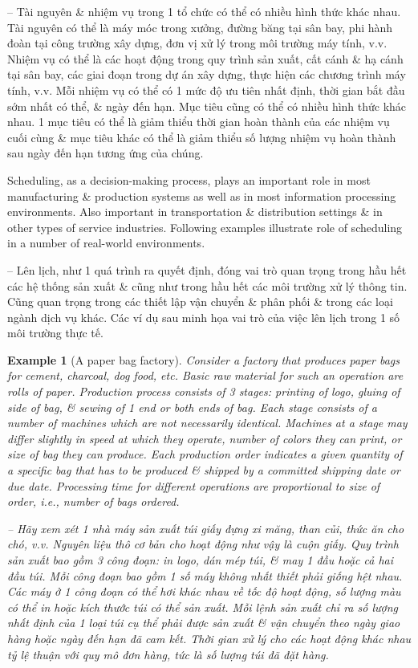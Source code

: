 \documentclass{article}
\newtheorem{example}{Example}
\begin{document}
\begin{itemize}
\begin{itemize}
        -- Tài nguyên \& nhiệm vụ trong 1 tổ chức có thể có nhiều hình thức khác nhau. Tài nguyên có thể là máy móc trong xưởng, đường băng tại sân bay, phi hành đoàn tại công trường xây dựng, đơn vị xử lý trong môi trường máy tính, v.v. Nhiệm vụ có thể là các hoạt động trong quy trình sản xuất, cất cánh \& hạ cánh tại sân bay, các giai đoạn trong dự án xây dựng, thực hiện các chương trình máy tính, v.v. Mỗi nhiệm vụ có thể có 1 mức độ ưu tiên nhất định, thời gian bắt đầu sớm nhất có thể, \& ngày đến hạn. Mục tiêu cũng có thể có nhiều hình thức khác nhau. 1 mục tiêu có thể là giảm thiểu thời gian hoàn thành của các nhiệm vụ cuối cùng \& mục tiêu khác có thể là giảm thiểu số lượng nhiệm vụ hoàn thành sau ngày đến hạn tương ứng của chúng.
        
        Scheduling, as a decision-making process, plays an important role in most manufacturing \& production systems as well as in most information processing environments. Also important in transportation \& distribution settings \& in other types of service industries. Following examples illustrate role of scheduling in a number of real-world environments.
        
        -- Lên lịch, như 1 quá trình ra quyết định, đóng vai trò quan trọng trong hầu hết các hệ thống sản xuất \& cũng như trong hầu hết các môi trường xử lý thông tin. Cũng quan trọng trong các thiết lập vận chuyển \& phân phối \& trong các loại ngành dịch vụ khác. Các ví dụ sau minh họa vai trò của việc lên lịch trong 1 số môi trường thực tế.
        
        \begin{example}[A paper bag factory]
            Consider a factory that produces paper bags for cement, charcoal, dog food, etc. Basic raw material for such an operation are rolls of paper. Production process consists of 3 stages: printing of logo, gluing of side of bag, \& sewing of 1 end or both ends of bag. Each stage consists of a number of machines which are not necessarily identical. Machines at a stage may differ slightly in speed at which they operate, number of colors they can print, or size of bag they can produce. Each production order indicates a given quantity of a specific bag that has to be produced \& shipped by a committed shipping date or due date. Processing time for different operations are proportional to size of order, i.e., number of bags ordered.
            
            -- Hãy xem xét 1 nhà máy sản xuất túi giấy đựng xi măng, than củi, thức ăn cho chó, v.v. Nguyên liệu thô cơ bản cho hoạt động như vậy là cuộn giấy. Quy trình sản xuất bao gồm 3 công đoạn: in logo, dán mép túi, \& may 1 đầu hoặc cả hai đầu túi. Mỗi công đoạn bao gồm 1 số máy không nhất thiết phải giống hệt nhau. Các máy ở 1 công đoạn có thể hơi khác nhau về tốc độ hoạt động, số lượng màu có thể in hoặc kích thước túi có thể sản xuất. Mỗi lệnh sản xuất chỉ ra số lượng nhất định của 1 loại túi cụ thể phải được sản xuất \& vận chuyển theo ngày giao hàng hoặc ngày đến hạn đã cam kết. Thời gian xử lý cho các hoạt động khác nhau tỷ lệ thuận với quy mô đơn hàng, tức là số lượng túi đã đặt hàng.
            

\end{example}
\end{itemize}
\end{itemize}
\end{document}
